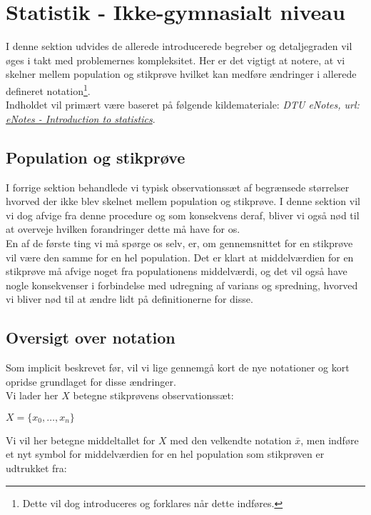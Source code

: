 \documentclass{article}
\newcommand{\mellemrum}{\vspace{2 ex}}
\newcommand{\cent}[1]{ \mellemrum \begin{center} #1\end{center} \mellemrum }
\begin{document}
	\section{Statistik - Ikke-gymnasialt niveau}
	
	I denne sektion udvides de allerede introducerede begreber og detaljegraden vil øges i takt med problemernes kompleksitet. Her er det vigtigt at notere, at vi skelner mellem population og stikprøve hvilket kan medføre ændringer i allerede defineret notation\footnote{Dette vil dog introduceres og forklares når dette indføres.}. \\
	Indholdet vil primært være baseret på følgende kildemateriale: \textit{DTU eNotes, url: \href{https://02402.compute.dtu.dk}{eNotes - Introduction to statistics}}.
	
	\subsection{Population og stikprøve}
	
	I forrige sektion behandlede vi typisk observationssæt af begrænsede størrelser hvorved der ikke blev skelnet mellem population og stikprøve. I denne sektion vil vi dog afvige fra denne procedure og som konsekvens deraf, bliver vi også nød til at overveje hvilken forandringer dette må have for os. \\
	En af de første ting vi må spørge os selv, er, om gennemsnittet for en stikprøve vil være den samme for en hel population. Det er klart at middelværdien for en stikprøve må afvige noget fra populationens middelværdi, og det vil også have nogle konsekvenser i forbindelse med udregning af varians og spredning, hvorved vi bliver nød til at ændre lidt på definitionerne for disse.  
	
	\subsection{Oversigt over notation}
	
	Som implicit beskrevet før, vil vi lige gennemgå kort de nye notationer og kort opridse grundlaget for disse ændringer.\\
	
	Vi lader her $X$ betegne stikprøvens observationssæt:
	
	\cent{$ X = \{x_0,\dots, x_n \} $}
	
	Vi vil her betegne middeltallet for $X$ med den velkendte notation $\bar{x}$, men indføre et nyt symbol for middelværdien for en hel population som stikprøven er udtrukket fra:
	
\end{document}
